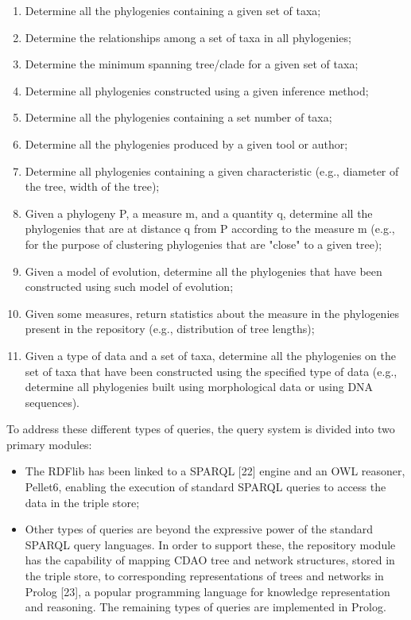 \documentclass[10pt]{article}
\begin{document}
\begin{enumerate}
\item Determine all the phylogenies containing a given set of taxa;
\item Determine the relationships among a set of taxa in all phylogenies;
\item Determine the minimum spanning tree/clade for a given set of taxa;
\item Determine all phylogenies constructed using a given inference method;
\item Determine all the phylogenies containing a set number of taxa;
\item Determine all the phylogenies produced by a given tool or author;
\item Determine all phylogenies containing a given characteristic (e.g., diameter of the tree, width of the tree);
\item Given a phylogeny P, a measure m, and a quantity q, determine all the phylogenies that are at distance q from P according to the measure m (e.g., for the purpose of clustering phylogenies that are "close" to a given tree);
\item Given a model of evolution, determine all the phylogenies that have been constructed using such model of evolution;
\item Given some measures, return statistics about the measure in the phylogenies present in the repository (e.g., distribution of tree lengths);
\item Given a type of data and a set of taxa, determine all the phylogenies on the set of taxa that have been constructed using the specified type of data (e.g., determine all phylogenies built using morphological data or using DNA sequences).
\end{enumerate}
To address these different types of queries, the query system is divided into two primary modules:
\begin{itemize}
\item The RDFlib has been linked to a SPARQL [22] engine and an OWL reasoner, Pellet6, enabling the execution of standard SPARQL queries to access the data in the triple store;
\item Other types of queries are beyond the expressive power of the standard SPARQL query languages. In order to support these, the repository module has the capability of mapping CDAO tree and network structures, stored in the triple store, to corresponding representations of trees and networks in Prolog [23], a popular programming language for knowledge representation and reasoning. The remaining types of queries are implemented in Prolog.
\end{itemize}
\end{document}
